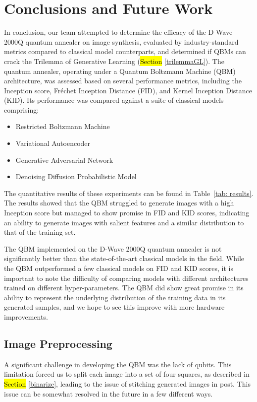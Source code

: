 \documentclass[technologies,article,accept,pdftex,moreauthors]{Definitions/mdpi}
\begin{document}
\section{Conclusions and Future Work}
\label{future}
In conclusion, our team attempted to determine the efficacy of the D-Wave 2000Q quantum annealer on image synthesis, evaluated by industry-standard metrics compared to classical model counterparts, and determined if QBMs can crack the Trilemma of Generative Learning (\hl{Section} \ref{trilemmaGL}). The quantum annealer, operating under a Quantum Boltzmann Machine (QBM) architecture, was assessed based on several performance metrics, including the Inception score, Fréchet Inception Distance (FID), and Kernel Inception Distance (KID). Its performance was compared against a suite of classical models comprising: %
\begin{itemize}
\item Restricted Boltzmann Machine
\item Variational Autoencoder
\item Generative Adversarial Network
\item Denoising Diffusion Probabilistic Model
\end{itemize}


The quantitative results of these experiments can be found in Table~\ref{tab: results}. The results showed that the QBM struggled to generate images with a high Inception score but managed to show promise in FID and KID scores, indicating an ability to generate images with salient features and a similar distribution to that of the training set.


The QBM implemented on the D-Wave 2000Q quantum annealer is not significantly better than the state-of-the-art classical models in the field. While the QBM outperformed a few classical models on FID and KID scores, it is important to note the difficulty of comparing models with different architectures trained on different hyper-parameters. The QBM did show great promise in its ability to represent the underlying distribution of the training data in its generated samples, and we hope to see this improve with more hardware improvements.

\subsection{Image Preprocessing}
A significant challenge in developing the QBM was the lack of qubits. This limitation forced us to split each image into a set of four squares, as described in \hl{Section} \ref{binarize}, leading to the issue of stitching generated images in post. This issue can be somewhat resolved in the future in a few different ways.%
\end{document}
